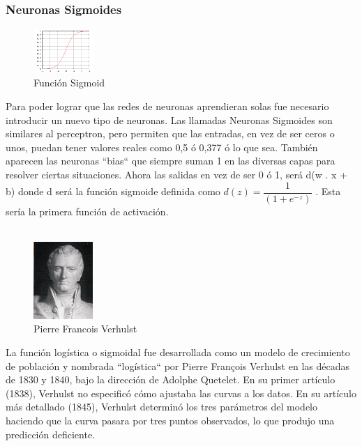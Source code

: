 \documentclass[a4paper]{article}
\begin{document}
\subsubsection{Neuronas Sigmoides}
\begin{figure} %
    \centering
    \includegraphics[width=0.2\textwidth]{./images/Logistic-curve.png}
    \caption{Función Sigmoid}
\end{figure}
Para poder lograr que las redes de neuronas aprendieran solas fue 
necesario introducir un nuevo tipo de neuronas. Las llamadas 
Neuronas Sigmoides son similares al perceptron, pero permiten que 
las entradas, en vez de ser ceros o unos, puedan tener valores 
reales como 0,5 ó 0,377 ó lo que sea. También aparecen las 
neuronas ``bias`` que siempre suman 1 en las diversas capas para 
resolver ciertas situaciones. Ahora las salidas en vez de ser 0 ó 
1, será d(w . x + b) donde d será la función sigmoide definida 
como $d(z) = \dfrac{1}{( 1 +e^{-z})}$ . Esta sería la primera 
función de activación.
\\
\\
\begin{figure} %
    \centering
    \includegraphics[width=0.2\textwidth]{./images/Pierre_Francois.jpeg}
    \caption{Pierre Francois Verhulst}
\end{figure}

La función logística o sigmoidal fue desarrollada como un modelo 
de crecimiento de población y nombrada ``logística`` por Pierre 
François Verhulst en las décadas de 1830 y 1840, bajo la dirección 
de Adolphe Quetelet.
En su primer artículo (1838), Verhulst no especificó cómo ajustaba 
las curvas a los datos. En su artículo más detallado (1845), 
Verhulst determinó los tres parámetros del modelo haciendo que la 
curva pasara por tres puntos observados, lo que produjo una 
predicción deficiente.
\end{document}
